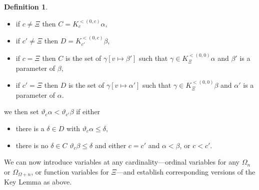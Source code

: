 \documentclass[11pt]{amsart}
\theoremstyle{definition}
\newtheorem{definition}[theorem]{Definition}
\begin{document}
\begin{definition}
\begin{itemize}
\begin{itemize}
  \item if $c\neq \Xi$ then $C=K^{<(0,c)}_c\alpha$,
  \item if $c'\neq \Xi$ then $D=K^{<(0,c)}_{c'}\beta$,
  \item if $c=\Xi$ then $C$ is the set of $\gamma[v\mapsto\beta']$ such that $\gamma\in K^{<(0,0)}_\Xi\alpha$ and $\beta'$ is a parameter of $\beta$,
  \item if $c'=\Xi$ then $D$ is the set of $\gamma[v\mapsto\alpha']$ such that $\gamma\in K^{<(0,0)}_\Xi\beta$ and $\alpha'$ is a parameter of $\alpha$.
  \end{itemize}
  we then set $\vartheta_c\alpha<\vartheta_{c'}\beta$ if either
  \begin{itemize}
  \item there is a $\delta\in D$ with $\vartheta_c\alpha\leq\delta$, 
  \item there is no $\delta\in C$ $\vartheta_c\beta\leq\delta$ and either $c=c'$ and $\alpha<\beta$, or $c<c'$.
  \end{itemize}
\end{itemize}
\end{definition}

We can now introduce variables at any cardinality---ordinal variables for any $\Omega_n$ or $\Omega_{\Omega+n}$, or function variables for $\Xi$---and establish corresponding versions of the Key Lemma as above.


\printbibliography
\end{document}
